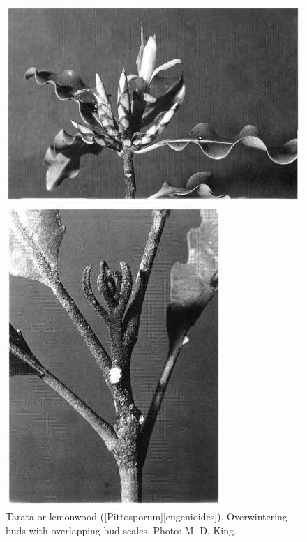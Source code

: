 \begin{figure}[htb]
	\centering
	\begin{minipage}[t]{0.664\textwidth}
		\centering
		\includegraphics[width=\textwidth]{graphics/figure24tarata.jpg}
    	\caption[Tarata or lemonwood]{Tarata or lemonwood ([Pittosporum][eugenioides]). Overwintering buds with overlapping bud scales. Photo: M. D. King.}%
    	\label{fig:24tarata}
	\end{minipage}\hfill%
	\begin{minipage}[t]{0.316\textwidth}
    	\centering
    	\includegraphics[width=\textwidth]{graphics/figure25rewarewa.jpg}

\end{minipage}
\end{figure}
